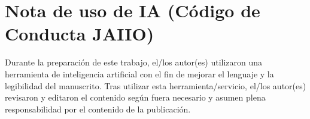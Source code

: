 \documentclass{llncs}
\begin{document}
\section{Nota de uso de IA (Código de Conducta JAIIO)}\label{nota-de-uso-de-ia-cuxf3digo-de-conducta-jaiio}

Durante la preparación de este trabajo, el/los autor(es) utilizaron una
herramienta de inteligencia artificial con el fin de mejorar el lenguaje
y la legibilidad del manuscrito. Tras utilizar esta
herramienta/servicio, el/los autor(es) revisaron y editaron el contenido
según fuera necesario y asumen plena responsabilidad por el contenido de
la publicación.

\printbibliography
\end{document}
